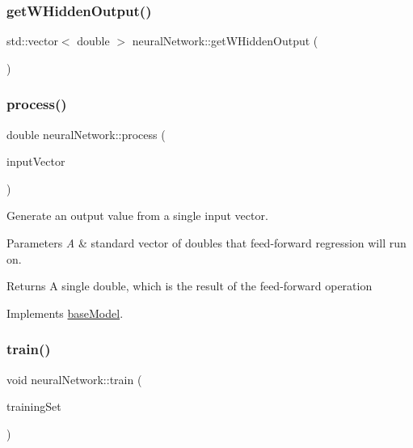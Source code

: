 \subsubsection{\texorpdfstring{get\+W\+Hidden\+Output()}{getWHiddenOutput()}}
{\footnotesize\ttfamily std\+::vector$<$ double $>$ neural\+Network\+::get\+W\+Hidden\+Output (\begin{DoxyParamCaption}{ }\end{DoxyParamCaption})}

\mbox{\label{classneural_network_a2d93cf6790db969ea067e8588b10d204}} 
\subsubsection{\texorpdfstring{process()}{process()}}
{\footnotesize\ttfamily double neural\+Network\+::process (\begin{DoxyParamCaption}\item[{const std\+::vector$<$ double $>$ \&}]{input\+Vector }\end{DoxyParamCaption})\hspace{0.3cm}{\ttfamily [virtual]}}

Generate an output value from a single input vector. 
\begin{DoxyParams}{Parameters}
{\em A} & standard vector of doubles that feed-\/forward regression will run on. \\
\hline
\end{DoxyParams}
\begin{DoxyReturn}{Returns}
A single double, which is the result of the feed-\/forward operation 
\end{DoxyReturn}


Implements \hyperlink{classbase_model_a95ef1dffc2857cdd1a57c23f5f9ee2d1}{base\+Model}.

\mbox{\label{classneural_network_af0da201b2b09bef38471f5ceaca7c2ea}} 
\subsubsection{\texorpdfstring{train()}{train()}}
{\footnotesize\ttfamily void neural\+Network\+::train (\begin{DoxyParamCaption}\item[{const std\+::vector$<$ \hyperlink{structtraining_example}{training\+Example} $>$ \&}]{training\+Set }\end{DoxyParamCaption})\hspace{0.3cm}{\ttfamily [virtual]}}

